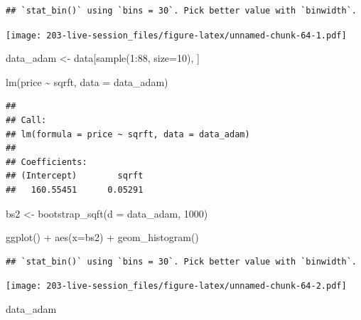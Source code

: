 \documentclass[
]{book}
\newenvironment{Shaded}{\begin{snugshade}}{\end{snugshade}}
\newcommand{\AttributeTok}[1]{\textcolor[rgb]{0.77,0.63,0.00}{#1}}
\newcommand{\DecValTok}[1]{\textcolor[rgb]{0.00,0.00,0.81}{#1}}
\newcommand{\FunctionTok}[1]{\textcolor[rgb]{0.00,0.00,0.00}{#1}}
\newcommand{\NormalTok}[1]{#1}
\newcommand{\OtherTok}[1]{\textcolor[rgb]{0.56,0.35,0.01}{#1}}
\newcommand{\SpecialCharTok}[1]{\textcolor[rgb]{0.00,0.00,0.00}{#1}}
\theoremstyle{definition}
\theoremstyle{definition}
\theoremstyle{definition}
\theoremstyle{definition}
\theoremstyle{remark}
\begin{document}
\begin{verbatim}
## `stat_bin()` using `bins = 30`. Pick better value with `binwidth`.
\end{verbatim}

\texttt{[image: 203-live-session\_files/figure-latex/unnamed-chunk-64-1.pdf]}

\begin{Shaded}
\begin{Highlighting}[]
\NormalTok{data\_adam }\OtherTok{\textless{}{-}}\NormalTok{ data[}\FunctionTok{sample}\NormalTok{(}\DecValTok{1}\SpecialCharTok{:}\DecValTok{88}\NormalTok{, }\AttributeTok{size=}\DecValTok{10}\NormalTok{), ]}

\FunctionTok{lm}\NormalTok{(price }\SpecialCharTok{\textasciitilde{}}\NormalTok{ sqrft, }\AttributeTok{data =}\NormalTok{ data\_adam)}
\end{Highlighting}
\end{Shaded}

\begin{verbatim}
## 
## Call:
## lm(formula = price ~ sqrft, data = data_adam)
## 
## Coefficients:
## (Intercept)        sqrft  
##   160.55451      0.05291
\end{verbatim}

\begin{Shaded}
\begin{Highlighting}[]
\NormalTok{bs2 }\OtherTok{\textless{}{-}} \FunctionTok{bootstrap\_sqft}\NormalTok{(}\AttributeTok{d =}\NormalTok{ data\_adam, }\DecValTok{1000}\NormalTok{)}

\FunctionTok{ggplot}\NormalTok{() }\SpecialCharTok{+} 
  \FunctionTok{aes}\NormalTok{(}\AttributeTok{x=}\NormalTok{bs2) }\SpecialCharTok{+} 
  \FunctionTok{geom\_histogram}\NormalTok{()}
\end{Highlighting}
\end{Shaded}

\begin{verbatim}
## `stat_bin()` using `bins = 30`. Pick better value with `binwidth`.
\end{verbatim}

\texttt{[image: 203-live-session\_files/figure-latex/unnamed-chunk-64-2.pdf]}

\begin{Shaded}
\begin{Highlighting}[]
\NormalTok{data\_adam}
\end{Highlighting}
\end{Shaded}
\end{document}
